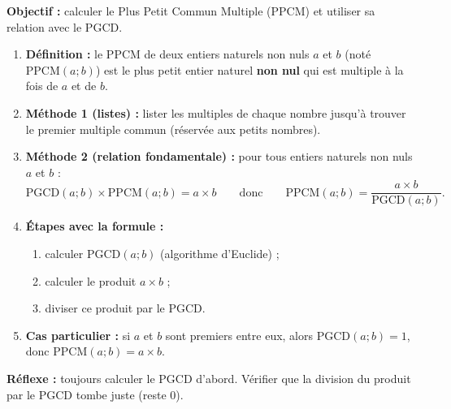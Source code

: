 \documentclass[11pt]{article}
\begin{document}
\begin{methode}[PPCM et relation fondamentale $\text{PGCD} \times \text{PPCM} = a \times b$]
\textbf{Objectif :} calculer le Plus Petit Commun Multiple (PPCM) et utiliser sa relation avec le PGCD.
\begin{enumerate}
    \item \textbf{Définition :} le PPCM de deux entiers naturels non nuls $a$ et $b$ (noté $\text{PPCM}(a; b)$) est le plus petit entier naturel \textbf{non nul} qui est multiple à la fois de $a$ et de $b$.
    \item \textbf{Méthode 1 (listes) :} lister les multiples de chaque nombre jusqu'à trouver le premier multiple commun (réservée aux petits nombres).
    \item \textbf{Méthode 2 (relation fondamentale) :} pour tous entiers naturels non nuls $a$ et $b$ :
    \[ \text{PGCD}(a; b) \times \text{PPCM}(a; b) = a \times b \qquad \text{donc} \qquad \text{PPCM}(a; b) = \dfrac{a \times b}{\text{PGCD}(a; b)}. \]
    \item \textbf{Étapes avec la formule :}
    \begin{enumerate}
        \item calculer $\text{PGCD}(a; b)$ (algorithme d'Euclide) ;
        \item calculer le produit $a \times b$ ;
        \item diviser ce produit par le PGCD.
    \end{enumerate}
    \item \textbf{Cas particulier :} si $a$ et $b$ sont premiers entre eux, alors $\text{PGCD}(a;b)=1$, donc $\text{PPCM}(a; b) = a \times b$.
\end{enumerate}
\textbf{Réflexe :} toujours calculer le PGCD d'abord. Vérifier que la division du produit par le PGCD tombe juste (reste 0).
\end{methode}
\end{document}
